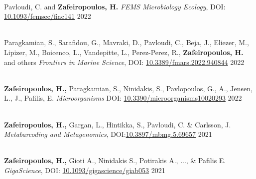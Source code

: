 \documentclass[
    a4paper,
]{fortysecondscv}
\begin{document}
\begin{cvtable}
    \\

    {Pavloudi, C. and \textbf{Zafeiropoulos, H.} }
    {\textit{FEMS Microbiology Ecology},
    DOI: \href{https://doi.org/10.1093/femsec/fiac141}{10.1093/femsec/fiac141}}
    {2022}

    \\

    {Paragkamian, S., Sarafidou, G., Mavraki, D., Pavloudi, C., Beja, J., Eliezer, M., Lipizer, M., Boicenco, L., Vandepitte, L., Perez-Perez, R., \textbf{Zafeiropoulos, H.} and others}
    {\textit{Frontiers in Marine Science}, 
    DOI: \href{https://doi.org/10.3389/fmars.2022.940844}{10.3389/fmars.2022.940844}}
    {2022} 

    \\

    {\textbf{Zafeiropoulos, H.,} Paragkamian, S., Ninidakis, S., Pavlopoulos, G., A., Jensen, L., J., Pafilis, E. }
    {\textit{Microorganisms} 
    DOI: \href{10.3390/microorganisms10020293}{10.3390/microorganisms10020293}}
    {2022}

    \\

    {\textbf{Zafeiropoulos, H.,} Gargan, L., Hintikka, S., Pavloudi, C. \& Carlsson, J.}
    {\textit{Metabarcoding and Metagenomics}, 
    DOI:\href{https://doi.org/10.3897/mbmg.5.69657}{10.3897/mbmg.5.69657}}
    {2021}

    \\

    {\textbf{Zafeiropoulos, H.,} Gioti A., Ninidakis S., Potirakis A., ..., \& Pafilis E.}
    {\textit{GigaScience}, 
    DOI: \href{https://doi.org/10.1093/gigascience/giab053}{10.1093/gigascience/giab053}}
    {2021}

    \\

\end{cvtable}
\end{document}
